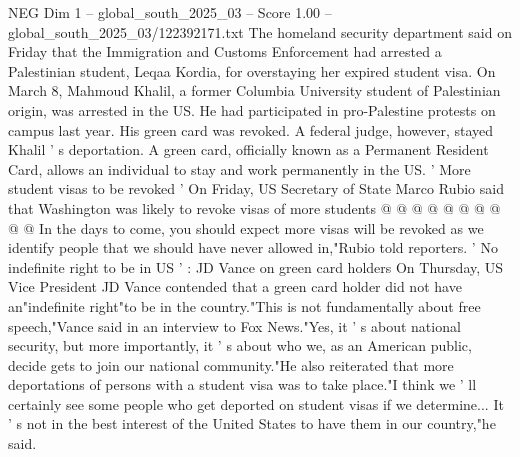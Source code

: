 \begin{textsample}{NEG Dim 1 – global\_south\_2025\_03 – Score 1.00 – global\_south\_2025\_03/122392171.txt}
The homeland security department said on Friday that the Immigration and Customs Enforcement had arrested a Palestinian student, Leqaa Kordia, for overstaying her expired student visa.
On March 8, Mahmoud Khalil, a former Columbia University student of Palestinian origin, was arrested in the US.
He had participated in pro-Palestine protests on campus last year.
His green card was revoked.
A federal judge, however, stayed Khalil ' s deportation.
A green card, officially known as a Permanent Resident Card, allows an individual to stay and work permanently in the US. ' More student visas to be revoked ' On Friday, US Secretary of State Marco Rubio said that Washington was likely to revoke visas of more students @ @ @ @ @ @ @ @ @ @ In the days to come, you should expect more visas will be revoked as we identify people that we should have never allowed in,"Rubio told reporters. ' No indefinite right to be in US ' : JD Vance on green card holders On Thursday, US Vice President JD Vance contended that a green card holder did not have an"indefinite right"to be in the country."This is not fundamentally about free speech,"Vance said in an interview to Fox News."Yes, it ' s about national security, but more importantly, it ' s about who we, as an American public, decide gets to join our national community."He also reiterated that more deportations of persons with a student visa was to take place."I think we ' ll certainly see some people who get deported on student visas if we determine...
It ' s not in the best interest of the United States to have them in our country,"he said.

\end{textsample}
